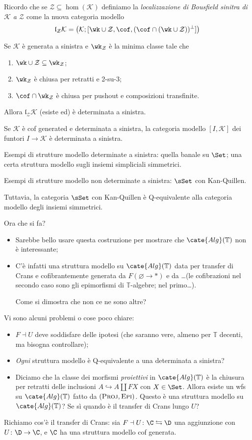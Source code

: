 \documentclass[12pt]{amsart}
\def\Alg{\cate{Alg}}
\def\T{\mathbb{T}}
\def\K{\mathcal K}
\begin{document}
Ricordo che se $\mathcal Z \subseteq \hom(\K)$ definiamo la \emph{localizzazione di Bousfield sinitra di $\K$ a $\mathcal Z$} come la nuova categoria modello
\[
\mathfrak{l}_{\mathcal Z}\K = \big( \K; [\wk\cup\mathcal Z, \cof, (\cof\cap(\wk\cup\mathcal Z))^\perp]\big)
\]
\begin{remark}
Se $\K$ è generata a sinistra e $\wk_{\mathcal Z}$ è la minima classe tale che
\begin{enumerate}
	\item $\wk\cup\mathcal Z \subseteq \wk_{\mathcal Z}$;
	\item $\wk_{\mathcal Z}$ è chiusa per retratti e 2-su-3;
	\item $\cof\cap \wk_{\mathcal Z}$ è chiusa per pushout e composizioni transfinite.
\end{enumerate}
Allora $\mathfrak{l}_{\mathcal Z}\K$ (esiste ed) è determinata a sinistra.
\end{remark}
\begin{remark}
Se $\K$ è cof generated e determinata a sinistra, la categoria modello $[I,\K]$ dei funtori $I\to\K$ è determinata a sinistra.
\end{remark}
\begin{example}
Esempi di strutture modello determinate a sinistra: quella banale su $\Set$; una certa struttura modello sugli insiemi simpliciali simmetrici.

Esempi di strutture modello non determinate a sinistra: $\sSet$ con Kan-Quillen.

Tuttavia, la categoria $\sSet$ con Kan-Quillen è Q-equivalente alla categoria modello degli insiemi simmetrici.
\end{example}
Ora che si fa?
\begin{itemize}
	\item Sarebbe bello usare questa costruzione per mostrare che $\Alg(\T)$ non è interessante;
	\item C'è infatti una struttura modello su $\Alg(\T)$ data per transfer di Crans e cofibrantemente generata da $F(\varnothing \to *)$ e da \dots (le cofibrazioni nel secondo caso sono gli epimorfismi di $\T$-algebre; nel primo\dots).

	Come si dimostra che non ce ne sono altre?
\end{itemize}
Vi sono alcuni problemi o cose poco chiare:
\begin{itemize}
	\item $F\dashv U$ deve soddisfare delle ipotesi (che saranno vere, almeno per $\T$ decenti, ma bisogna controllare);
	\item \emph{Ogni} struttura modello è Q-equivalente a una determinata a sinistra?
	\item Diciamo che la classe dei morfismi \emph{proiettivi} in $\Alg(\T)$ è la chiusura per retratti delle inclusioni $A \hookrightarrow A \amalg FX$ con $X\in\Set$. Allora esiste un wfs su $\Alg(\T)$ fatto da $(\textsc{Proj}, \textsc{Epi})$. Questo è una struttura modello su $\Alg(\T)$? Se sì quando è il transfer di Crans lungo $U$?
\end{itemize}
Richiamo cos'è il transfer di Crans: sia $F \dashv U \colon \C \leftrightarrows \D$ una aggiunzione con $U\colon \D \to \C$, e $\C$ ha una struttura modello cof generata.
\end{document}
